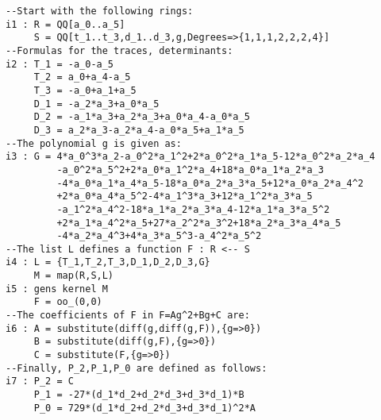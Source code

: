 %
\begin{small} 
\begin{verbatim}
--Start with the following rings:
i1 : R = QQ[a_0..a_5]
     S = QQ[t_1..t_3,d_1..d_3,g,Degrees=>{1,1,1,2,2,2,4}]
--Formulas for the traces, determinants:
i2 : T_1 = -a_0-a_5
     T_2 = a_0+a_4-a_5
     T_3 = -a_0+a_1+a_5
     D_1 = -a_2*a_3+a_0*a_5
     D_2 = -a_1*a_3+a_2*a_3+a_0*a_4-a_0*a_5
     D_3 = a_2*a_3-a_2*a_4-a_0*a_5+a_1*a_5
--The polynomial g is given as:
i3 : G = 4*a_0^3*a_2-a_0^2*a_1^2+2*a_0^2*a_1*a_5-12*a_0^2*a_2*a_4
         -a_0^2*a_5^2+2*a_0*a_1^2*a_4+18*a_0*a_1*a_2*a_3
         -4*a_0*a_1*a_4*a_5-18*a_0*a_2*a_3*a_5+12*a_0*a_2*a_4^2
         +2*a_0*a_4*a_5^2-4*a_1^3*a_3+12*a_1^2*a_3*a_5
         -a_1^2*a_4^2-18*a_1*a_2*a_3*a_4-12*a_1*a_3*a_5^2
         +2*a_1*a_4^2*a_5+27*a_2^2*a_3^2+18*a_2*a_3*a_4*a_5
         -4*a_2*a_4^3+4*a_3*a_5^3-a_4^2*a_5^2  
--The list L defines a function F : R <-- S
i4 : L = {T_1,T_2,T_3,D_1,D_2,D_3,G} 
     M = map(R,S,L)
i5 : gens kernel M
     F = oo_(0,0)
--The coefficients of F in F=Ag^2+Bg+C are:
i6 : A = substitute(diff(g,diff(g,F)),{g=>0})
     B = substitute(diff(g,F),{g=>0})
     C = substitute(F,{g=>0})
--Finally, P_2,P_1,P_0 are defined as follows:
i7 : P_2 = C
     P_1 = -27*(d_1*d_2+d_2*d_3+d_3*d_1)*B
     P_0 = 729*(d_1*d_2+d_2*d_3+d_3*d_1)^2*A
\end{verbatim}
\end{small}